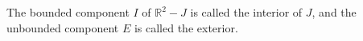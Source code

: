 The bounded component $I$ of $\mathbb{R}^2 - J$ is called the interior of $J$, and the unbounded component $E$ is called the exterior.
